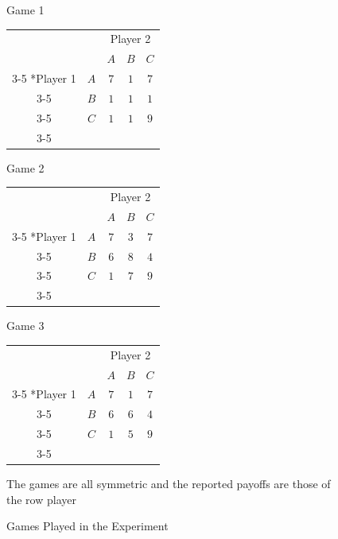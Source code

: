 \vskip12pt
\begin{figure}[h]
\captionsetup{justification=centering}
  \caption[caption]{Games Played in the Experiment}
   \label{fig:Games}

    \begin{minipage}[c]{.32\textwidth}
    \centering
    Game 1
    \vskip6pt
    \begin{tabular}{cc|c|c|c|}
          & \multicolumn{1}{c}{} & \multicolumn{3}{c}{Player 2}\\
          & \multicolumn{1}{c}{} & \multicolumn{1}{c}{$A$} 
          & \multicolumn{1}{c}{$B$} 
          & \multicolumn{1}{c}{$C$} \\\cline{3-5}
      \multirow{2}*{Player 1}  & $A$ & $7$ & $1$ & $7$ \\\cline{3-5}
      & $B$ & $1$ & $1$ & $1$ \\\cline{3-5}
      & $C$ & $1$ & $1$ & $9$ \\\cline{3-5}
    \end{tabular}
\end{minipage}
\begin{minipage}[c]{.32\textwidth}
\centering
Game 2
\vskip6pt
\begin{tabular}{cc|c|c|c|}
      & \multicolumn{1}{c}{} & \multicolumn{3}{c}{Player 2}\\
      & \multicolumn{1}{c}{} & \multicolumn{1}{c}{$A$}  & \multicolumn{1}{c}{$B$} & \multicolumn{1}{c}{$C$} \\\cline{3-5}
      \multirow{2}*{Player 1}  & $A$ & $7$ & $3$ & $7$ \\\cline{3-5}
      & $B$ & $6$ & $8$ & $4$ \\\cline{3-5}
      & $C$ & $1$ & $7$ & $9$ \\\cline{3-5}
    \end{tabular}
\end{minipage}
\begin{minipage}[c]{.32\textwidth}
\centering
Game 3
\vskip6pt
\begin{tabular}{cc|c|c|c|}
      & \multicolumn{1}{c}{} & \multicolumn{3}{c}{Player 2}\\
      & \multicolumn{1}{c}{} & \multicolumn{1}{c}{$A$}  & \multicolumn{1}{c}{$B$} & \multicolumn{1}{c}{$C$} \\\cline{3-5}
      \multirow{2}*{Player 1}  & $A$ & $7$ & $1$ & $7$ \\\cline{3-5}
      & $B$ & $6$ & $6$ & $4$ \\\cline{3-5}
      & $C$ & $1$ & $5$ & $9$ \\\cline{3-5}
    \end{tabular}
\end{minipage}
\vskip12pt
\small
\centering

The games are all symmetric and the reported payoffs are those of the row player
\end{figure}
\justifying
\vskip12pt


